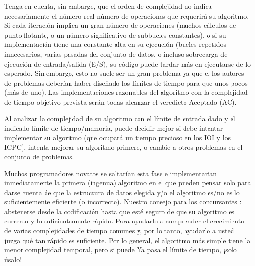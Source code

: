 \begin{enumerate}
	Tenga en cuenta, sin embargo, que el orden de complejidad no indica necesariamente el número real número de operaciones que requerirá su algoritmo. Si cada iteración implica un gran número de operaciones (muchos cálculos de punto flotante, o un número significativo de subbucles constantes), o si su implementación tiene una constante alta en su ejecución (bucles repetidos innecesarios, varias pasadas del conjunto de datos, o incluso sobrecarga de ejecución de entrada/salida (E/S), su código puede tardar más en ejecutarse de lo esperado. Sin embargo, esto no suele ser un gran problema ya que el los autores de problemas deberían haber diseñado los límites de tiempo para que unos pocos (más de uno). Las implementaciones razonables del algoritmo con la complejidad de tiempo objetivo prevista serán todas alcanzar el veredicto Aceptado (AC).
	
	Al analizar la complejidad de su algoritmo con el límite de entrada dado y el indicado límite de tiempo/memoria, puede decidir mejor si debe intentar implementar su algoritmo (que ocupará un tiempo precioso en los IOI y los ICPC), intenta mejorar su algoritmo primero, o cambie a otros problemas en el conjunto de problemas.
	
	Muchos programadores novatos se saltarían esta fase e implementarían inmediatamente la primera (ingenua) algoritmo en el que pueden pensar solo para darse cuenta de que la estructura de datos elegida y/o el algoritmo es/no es lo suficientemente eficiente (o incorrecto). Nuestro consejo para los concursantes : abstenerse desde la codificación hasta que esté seguro de que su algoritmo es correcto y lo suficientemente rápido.
	Para ayudarlo a comprender el crecimiento de varias complejidades de tiempo comunes y, por lo tanto, ayudarlo a usted juzga qué tan rápido es suficiente. Por lo general, el algoritmo más simple tiene la menor complejidad temporal, pero si puede Ya pasa el límite de tiempo, ¡solo úsalo!
	

\end{enumerate}

